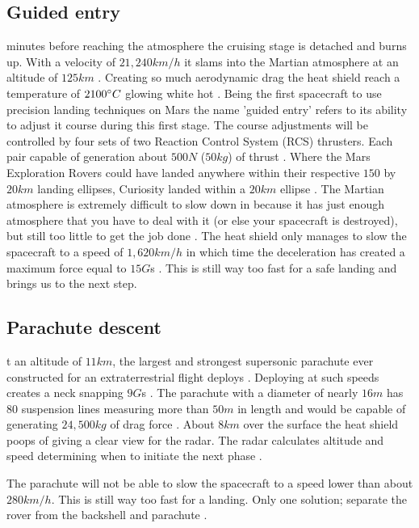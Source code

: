 \begin{multicols}{2}

\subsection*{Guided entry}
 minutes before reaching the atmosphere the cruising stage is detached and burns up.
With a velocity of $21,240km/h$ it slams into the Martian atmosphere at an altitude of $125km$ \cite{NASALanding_diag}.
Creating so much aerodynamic drag the heat shield reach a temperature of $2100\degree C$ glowing white hot \cite{NASALanding} \cite{NASA_youtube}.
Being the first spacecraft to use precision landing techniques on Mars the name 'guided entry' refers to its ability to adjust it course during this first stage.
The course adjustments will be controlled by four sets of two Reaction Control System (RCS) thrusters.
Each pair capable of generation about $500N$ ($50kg$) of thrust \cite{HistoricLanding}.
Where the Mars Exploration Rovers could have landed anywhere within their respective $150$ by $20km$ landing ellipses, Curiosity landed within a $20km$ ellipse \cite{NASALanding}.
The Martian atmosphere is extremely difficult to slow down in because it has just enough atmosphere that you have to deal with it (or else your spacecraft is destroyed), but still too little to get the job done \cite{NASA_youtube}.
The heat shield only manages to slow the spacecraft to a speed of $1,620km/h$ in which time the deceleration has created a maximum force equal to $15G$s \cite{NASALanding} \cite{HistoricLanding}.
This is still way too fast for a safe landing and brings us to the next step.

\subsection*{Parachute descent}
t an altitude of $11km$, the largest and strongest supersonic parachute ever constructed for an extraterrestrial flight deploys \cite{NASALanding} \cite{Parachute}.
Deploying at such speeds creates a neck snapping $9G$s \cite{NASA_youtube}.
The parachute with a diameter of nearly $16m$ has 80 suspension lines measuring more than $50m$ in length and would be capable of generating $24,500kg$ of drag force \cite{Parachute}.
About $8km$ over the surface the heat shield poops of giving a clear view for the radar.
The radar calculates altitude and speed determining when to initiate the next phase \cite{NASALanding}.

The parachute will not be able to slow the spacecraft to a speed lower than about $280km/h$.
This is still way too fast for a landing. Only one solution; separate the rover from the backshell and parachute \cite{NASALanding}.


\end{multicols}
